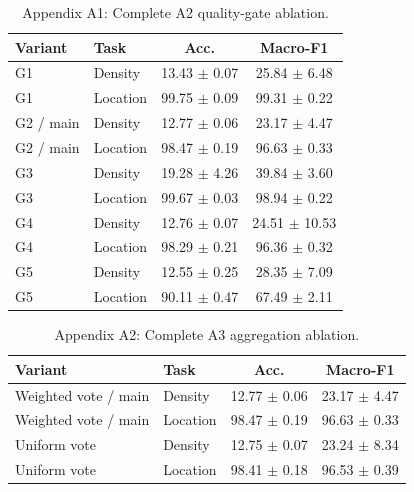 
\begin{table}[htbp]
\centering
\small
\caption{Appendix A1: Complete A2 quality-gate ablation.}
\label{tab:appendix-a2-quality-gate}
\begin{tabular}{llcc}
\hline
Variant & Task & Acc. & Macro-F1 \\
\hline
G1 & Density & 13.43 $\pm$ 0.07 & 25.84 $\pm$ 6.48 \\
G1 & Location & 99.75 $\pm$ 0.09 & 99.31 $\pm$ 0.22 \\
G2 / main & Density & 12.77 $\pm$ 0.06 & 23.17 $\pm$ 4.47 \\
G2 / main & Location & 98.47 $\pm$ 0.19 & 96.63 $\pm$ 0.33 \\
G3 & Density & 19.28 $\pm$ 4.26 & 39.84 $\pm$ 3.60 \\
G3 & Location & 99.67 $\pm$ 0.03 & 98.94 $\pm$ 0.22 \\
G4 & Density & 12.76 $\pm$ 0.07 & 24.51 $\pm$ 10.53 \\
G4 & Location & 98.29 $\pm$ 0.21 & 96.36 $\pm$ 0.32 \\
G5 & Density & 12.55 $\pm$ 0.25 & 28.35 $\pm$ 7.09 \\
G5 & Location & 90.11 $\pm$ 0.47 & 67.49 $\pm$ 2.11 \\
\hline
\end{tabular}
\end{table}

\begin{table}[htbp]
\centering
\small
\caption{Appendix A2: Complete A3 aggregation ablation.}
\label{tab:appendix-a3-aggregation}
\begin{tabular}{llcc}
\hline
Variant & Task & Acc. & Macro-F1 \\
\hline
Weighted vote / main & Density & 12.77 $\pm$ 0.06 & 23.17 $\pm$ 4.47 \\
Weighted vote / main & Location & 98.47 $\pm$ 0.19 & 96.63 $\pm$ 0.33 \\
Uniform vote & Density & 12.75 $\pm$ 0.07 & 23.24 $\pm$ 8.34 \\
Uniform vote & Location & 98.41 $\pm$ 0.18 & 96.53 $\pm$ 0.39 \\
\hline
\end{tabular}
\end{table}

